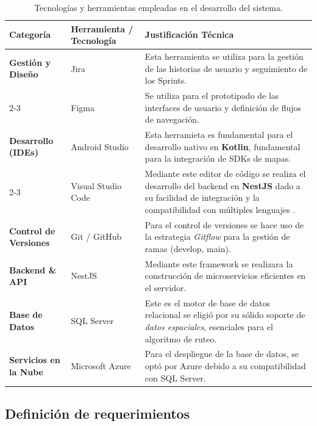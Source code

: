 \begin{table}[H]
\caption{Tecnologías y herramientas empleadas en el desarrollo del sistema.}
\label{tab:herramientas-tecnologias}
\centering
\begin{tabular}{|p{3.5cm}|p{4cm}|p{7cm}|}
\hline
\textbf{Categoría} & \textbf{Herramienta / Tecnología} & \textbf{Justificación Técnica} \\ \hline

\textbf{Gestión y Diseño} 
& Jira
& Esta herramienta se utiliza para la gestión de las historias de usuario y seguimiento de los Sprints. \\ \cline{2-3}

& Figma 
& Se utiliza para el prototipado de las interfaces de usuario y definición de flujos de navegación. \\ \hline

\textbf{Desarrollo (IDEs)} 
& Android Studio 
& Esta herramieta es fundamental para el desarrollo nativo en \textbf{Kotlin}, fundamental para la integración de SDKs de mapas. \\ \cline{2-3}

& Visual Studio Code 
& Mediante este editor de código se realiza el desarrollo del backend en \textbf{NestJS} dado a su facilidad de integración y la compatibilidad con múltiples lenguajes \cite{johnson2019visual}. \\ \hline

\textbf{Control de Versiones} 
& Git / GitHub 
& Para el control de versiones se hace uso de la estrategia \textit{Gitflow} para la gestión de ramas (develop, main)\cite{loeliger2012version}. \\ \hline

\textbf{Backend \& API} 
& NestJS
& Mediante este framework se realizara la construcción de microservicios eficientes en el servidor. \\ \hline

\textbf{Base de Datos} 
& SQL Server 
& Este es el motor de base de datos relacional se eligió por su sólido soporte de \textit{datos espaciales}, esenciales para el algoritmo de ruteo. \\ \hline
\textbf{Servicios en la Nube}
& Microsoft Azure
& Para el despliegue de la base de datos, se optó por Azure debido a su compatibilidad con SQL Server. \\ \hline

\end{tabular}
\end{table}

\subsection{Definición de requerimientos}

